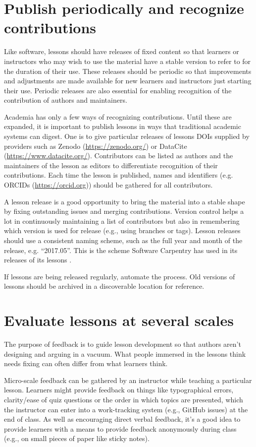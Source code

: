 \documentclass[10pt,letterpaper]{article}
\newcommand{\rulemajor}[1]{\section{#1}}
\begin{document}
\rulemajor{Publish periodically and recognize contributions}

Like software,
lessons should have releases of fixed content
so that learners or instructors who may wish to use the material have a stable version to refer to
for the duration of their use.
These releases should be periodic
so that improvements and adjustments are made available
for new learners and instructors just starting their use.
Periodic releases are also essential
for enabling recognition of the contribution of authors and maintainers.

Academia has only a few ways of recognizing contributions.
Until these are expanded,
it is important to publish lessons in ways that traditional academic systems can digest.
One is to give particular releases of lessons
DOIs supplied by providers such as Zenodo (\url{https://zenodo.org/})
or DataCite (\url{https://www.datacite.org/}).
Contributors can be listed as authors
and the maintainers of the lesson as editors
to differentiate recognition of their contributions.
Each time the lesson is published,
names and identifiers (e.g. ORCIDs (\url{https://orcid.org}))
should be gathered for all contributors.

A lesson release is a good opportunity to bring the material into a stable shape
by fixing outstanding issues and merging contributions.
Version control helps a lot in continuously maintaining a list of contributors
but also in remembering which version is used for release
(e.g., using branches or tags).
Lesson releases should use a consistent naming scheme,
such as the full year and month of the release,
e.g. ``2017.05''.
This is the scheme Software Carpentry has used in
its releases of its lessons \cite{shell2015,shell2017}.

If lessons are being released regularly,
automate the process.
Old versions of lessons should be archived in a discoverable location for reference.

\rulemajor{Evaluate lessons at several scales}

The purpose of feedback is to guide lesson development
so that authors aren't designing and arguing in a vacuum.
What people immersed in the lessons think needs fixing
can often differ from what learners think.

Micro-scale feedback can be gathered by an instructor while teaching a particular lesson.
Learners might provide feedback on things like typographical errors,
clarity/ease of quiz questions or the order in which topics are presented,
which the instructor can enter into a work-tracking system (e.g., GitHub issues) at the end of class.
As well as encouraging direct verbal feedback,
it's a good idea to provide learners with a means to provide feedback anonymously during class
(e.g., on small pieces of paper like sticky notes).
\end{document}
